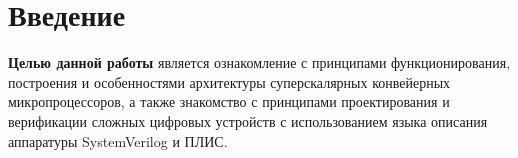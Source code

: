 \chapter*{Введение}

\textbf{Целью данной работы} является ознакомление с принципами
функционирования, построения и особенностями архитектуры суперскалярных
конвейерных микропроцессоров, а также знакомство с принципами проектирования и
верификации сложных цифровых устройств с использованием языка описания
аппаратуры SystemVerilog и ПЛИС.

